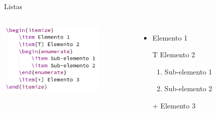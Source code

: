 \begin{frame}[fragile]{Listas}
    \begin{columns}
            \centering
            \hspace{1cm}\includegraphics[width=0.75\textwidth]{images/list.png}

            \begin{itemize}
                \item Elemento 1
                \item[T] Elemento 2
                \begin{enumerate}
                    \item Sub-elemento 1
                    \item Sub-elemento 2
                \end{enumerate}
                \item[+] Elemento 3
            \end{itemize}
    \end{columns}
\end{frame}


